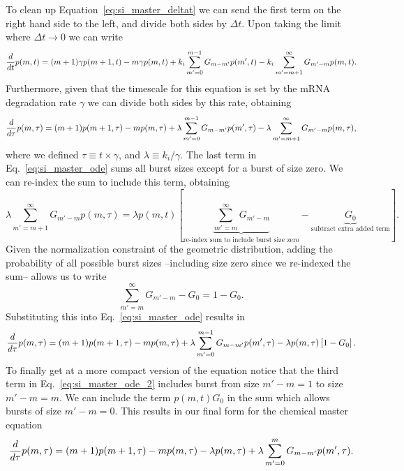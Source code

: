 To clean up Equation~\ref{eq:si_master_deltat} we can send the first term on the
right hand side to the left, and divide both sides by $\Delta t$. Upon taking
the limit where $\Delta t \rightarrow 0$ we can write
\begin{equation}
{d \over dt}p(m, t) = (m + 1) \gamma p(m + 1, t)
- m \gamma p(m, t)
+ k_i \sum_{m'=0}^{m-1} G_{m-m'} p(m', t) 
- k_i \sum_{m'=m + 1}^{\infty} G_{m'-m} p(m, t).
\end{equation}
Furthermore, given that the timescale for this equation is set by the mRNA
degradation rate $\gamma$ we can divide both sides by this rate, obtaining
\begin{equation}
{d \over d\tau}p(m, \tau) = (m + 1) p(m + 1, \tau)
- m p(m, \tau)
+ \lambda \sum_{m'=0}^{m-1} G_{m-m'} p(m', \tau) 
- \lambda \sum_{m'=m + 1}^{\infty} G_{m'-m} p(m, \tau),
\label{eq:si_master_ode}
\end{equation}
where we defined $\tau \equiv t \times \gamma$, and $\lambda \equiv k_i/\gamma$.
The last term in Eq.~\ref{eq:si_master_ode} sums all burst sizes except for a 
burst of size zero. We can re-index the sum to include this term, obtaining
\begin{equation}
\lambda \sum_{m'=m + 1}^{\infty} G_{m'-m} p(m, \tau) = \lambda p(m, t) \left[
\underbrace{\sum_{m'={m}}^{\infty}G_{m'-m}}
_{\text{re-index sum to include burst size zero}} -
\underbrace{G_0}_{\text{subtract extra added term}}\right].
\end{equation}
Given the normalization constraint of the geometric distribution, adding the
probability of all possible burst sizes --including size zero since we
re-indexed the sum-- allows us to write
\begin{equation}
\sum_{m'=m}^{\infty}G_{m'-m} - G_0 = 1 - G_0.
\end{equation}
Substituting this into Eq.~\ref{eq:si_master_ode} results in
\begin{equation}
{d \over d\tau}p(m, \tau) = (m + 1) p(m + 1, \tau)
- m p(m, \tau)
+ \lambda \sum_{m'=0}^{m-1} G_{m-m'} p(m', \tau) 
- \lambda p(m, \tau) \left[ 1 - G_0 \right].
\label{eq:si_master_ode_2}
\end{equation}
To finally get at a more compact version of the equation notice that the third
term in Eq.~\ref{eq:si_master_ode_2} includes burst from size $m'-m = 1$ to size
$m' - m = m$. We can include the term $p(m, t) G_0$ in the sum which allows
bursts of size $m' - m = 0$. This results in our final form for the chemical
master equation
\begin{align}
{d \over d\tau}p(m, \tau) = 
(m + 1) p(m+1, \tau)
- m p(m, \tau) - 
\lambda p(m, \tau)
+ \lambda \sum_{m^\prime=0}^m G_{m-m^\prime} p(m^\prime, \tau).
\label{eq:si_master_unreg}
\end{align}

